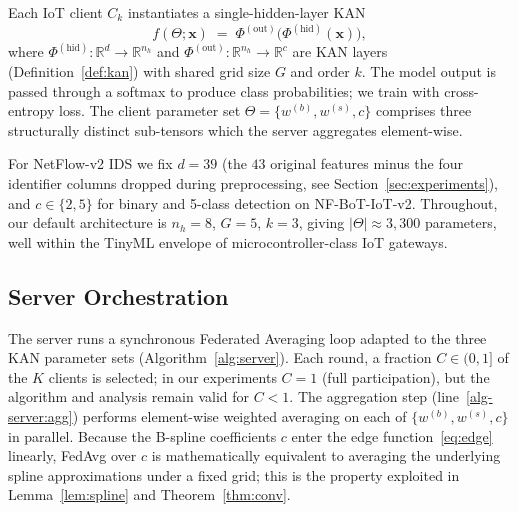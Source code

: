 Each IoT client $C_k$ instantiates a single-hidden-layer KAN
\begin{equation}
f(\Theta;\mathbf{x}) \;=\; \Phi^{(\text{out})}\big(\Phi^{(\text{hid})}(\mathbf{x})\big),
\end{equation}
where $\Phi^{(\text{hid})}: \mathbb{R}^d \to \mathbb{R}^{n_h}$ and $\Phi^{(\text{out})}: \mathbb{R}^{n_h} \to \mathbb{R}^{c}$ are KAN layers (Definition~\ref{def:kan}) with shared grid size $G$ and order $k$. The model output is passed through a softmax to produce class probabilities; we train with cross-entropy loss. The client parameter set $\Theta = \{w^{(b)}, w^{(s)}, c\}$ comprises three structurally distinct sub-tensors which the server aggregates element-wise.

For NetFlow-v2 IDS we fix $d = 39$ (the $43$ original features minus the four identifier columns dropped during preprocessing, see Section~\ref{sec:experiments}), and $c \in \{2, 5\}$ for binary and 5-class detection on NF-BoT-IoT-v2. Throughout, our default architecture is $n_h = 8$, $G = 5$, $k = 3$, giving $|\Theta| \approx 3{,}300$ parameters, well within the TinyML envelope of microcontroller-class IoT gateways.

\subsection{Server Orchestration}\label{subsec:server}

The server runs a synchronous Federated Averaging loop adapted to the three KAN parameter sets (Algorithm~\ref{alg:server}). Each round, a fraction $C \in (0, 1]$ of the $K$ clients is selected; in our experiments $C = 1$ (full participation), but the algorithm and analysis remain valid for $C < 1$. The aggregation step (line~\ref{alg-server:agg}) performs element-wise weighted averaging on each of $\{w^{(b)}, w^{(s)}, c\}$ in parallel. Because the B-spline coefficients $c$ enter the edge function~\eqref{eq:edge} linearly, FedAvg over $c$ is mathematically equivalent to averaging the underlying spline approximations under a fixed grid; this is the property exploited in Lemma~\ref{lem:spline} and Theorem~\ref{thm:conv}.

